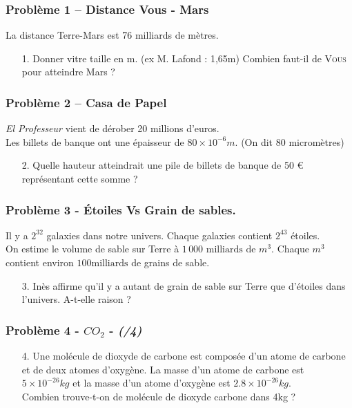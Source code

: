 \subsubsection*{Problème 1 – Distance Vous - Mars}

La distance Terre-Mars est 76 milliards de mètres. 

\begin{itemize}
\item[1.] Donner vitre taille en m. (ex M. Lafond : 1,65m) Combien faut-il de \textsc{Vous} pour atteindre Mars ?
\end{itemize}

\subsubsection*{Problème 2 – Casa de Papel}

\textit{\og El Professeur \fg{} } vient de dérober 20 millions d’euros. \\
Les billets de banque ont une épaisseur de $80 \times 10^{-6} m$. (On dit 80 micromètres)

\begin{itemize}
\item[2.] Quelle hauteur atteindrait une pile de billets de banque de 50 \euro{} représentant cette somme ?
\end{itemize}


\subsubsection*{Problème 3 - Étoiles Vs Grain de sables.}

Il y a $2^{32}$ galaxies dans notre univers. Chaque galaxies contient $2^{43}$ étoiles.  \\
On estime le volume de sable sur Terre à $1\,000 \text{ milliards de } m^3$. Chaque $m^3$ contient environ $100 \text{milliards}$ de grains de sable. 

\begin{itemize}
\item[3.] Inès affirme qu'il y a autant de grain de sable sur Terre que d'étoiles dans l'univers. A-t-elle raison ? 
\end{itemize}


\subsubsection*{Problème 4 - $CO_2$  - \textit{(/4)}}

\begin{enumerate}
  \item[4.] Une molécule de dioxyde de carbone est composée d'un atome de carbone et de deux atomes d'oxygène. La masse d'un atome de carbone est $5 \times 10^{-26}kg$ et la masse d'un atome d'oxygène est $2.8 \times 10^{-26}kg$. \\
  Combien trouve-t-on de molécule de dioxyde carbone dans 4kg ?
\end{enumerate}


